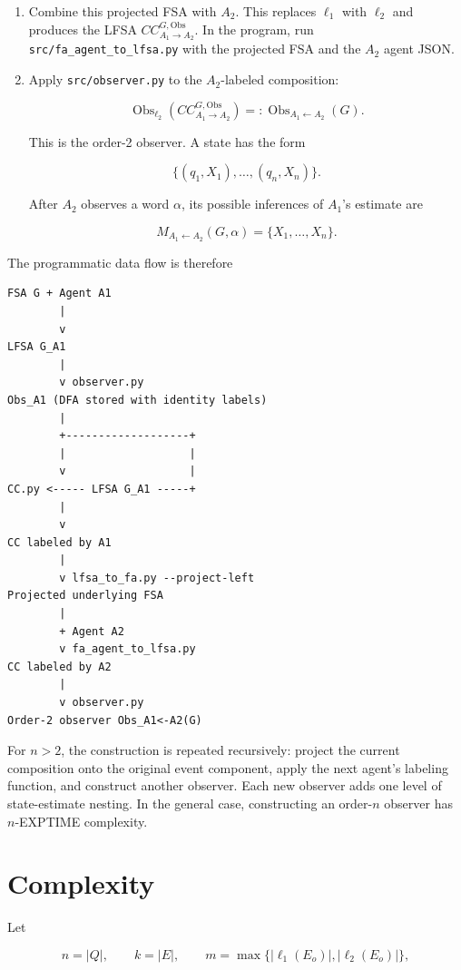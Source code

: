 \documentclass[11pt]{article}
\begin{document}
\begin{enumerate}
\item Combine this projected FSA with $A_2$. This replaces
$\ell_1$ with $\ell_2$ and produces the LFSA
$CC^{G,\mathrm{Obs}}_{A_1\rightarrow A_2}$. In the program, run
\texttt{src/fa\_agent\_to\_lfsa.py} with the projected FSA and the $A_2$
agent JSON.

\item Apply \texttt{src/observer.py} to the $A_2$-labeled composition:

\[
   \operatorname{Obs}_{\ell_2}
   \left(CC^{G,\mathrm{Obs}}_{A_1\rightarrow A_2}\right)
   =:
   \operatorname{Obs}_{A_1\leftarrow A_2}(G).
\]

This is the order-2 observer. A state has the form

\[
   \{(q_1,X_1),\ldots,(q_n,X_n)\}.
\]

After $A_2$ observes a word $\alpha$, its possible inferences of
$A_1$'s estimate are

\[
   M_{A_1\leftarrow A_2}(G,\alpha)
   =\{X_1,\ldots,X_n\}.
\]

\end{enumerate}

The programmatic data flow is therefore

\begin{verbatim}
FSA G + Agent A1
        |
        v
LFSA G_A1
        |
        v observer.py
Obs_A1 (DFA stored with identity labels)
        |
        +-------------------+
        |                   |
        v                   |
CC.py <----- LFSA G_A1 -----+
        |
        v
CC labeled by A1
        |
        v lfsa_to_fa.py --project-left
Projected underlying FSA
        |
        + Agent A2
        v fa_agent_to_lfsa.py
CC labeled by A2
        |
        v observer.py
Order-2 observer Obs_A1<-A2(G)
\end{verbatim}


For $n>2$, the construction is repeated recursively: project the
current composition onto the original event component, apply the next
agent's labeling function, and construct another observer. Each new
observer adds one level of state-estimate nesting. In the general case,
constructing an order-$n$ observer has $n$-EXPTIME complexity.

\section{Complexity}

Let

\[
n=|Q|,
\qquad
k=|E|,
\qquad
m=\max\{|\ell_1(E_o)|,|\ell_2(E_o)|\},
\]
\end{document}
